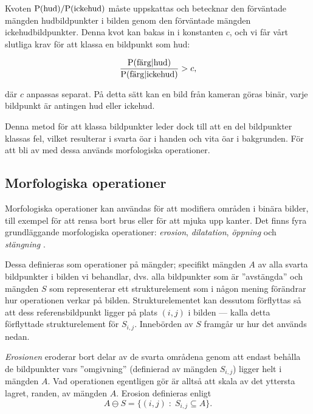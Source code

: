 \documentclass[../rapport_MVEX01-11-05]{subfiles}
\begin{document}
Kvoten $\mathrm{P}(\textrm{hud})/\mathrm{P}(\textrm{ickehud})$ måste uppskattas och betecknar
den förväntade mängden hudbildpunkter i bilden genom den förväntade mängden
ickehudbildpunkter. Denna kvot kan bakas in i konstanten $c$, och vi
får vårt slutliga krav för att klassa en bildpunkt som hud:

\begin{equation*}
	\frac{\mathrm{P}(\textrm{färg}|\textrm{hud})}{\mathrm{P}(\textrm{färg}|\textrm{ickehud})} > c,
\end{equation*}

där $c$ anpassas separat. På detta sätt kan en bild från kameran göras
binär, varje bildpunkt är antingen hud eller ickehud.

Denna metod för att klassa bildpunkter leder dock till att en del
bildpunkter klassas fel, vilket resulterar i svarta öar i handen
och vita öar i bakgrunden. För att bli av med dessa används
morfologiska operationer.

\subsection{Morfologiska operationer}\label{sec:morph}

Morfologiska operationer kan användas för att modifiera områden i
binära bilder, till exempel för att rensa bort brus eller för att
mjuka upp kanter. Det finns fyra grundläggande morfologiska
operationer: \emph{erosion}, \emph{dilatation}, \emph{öppning} och
\emph{stängning} \cite[s.~25]{Rudemo09}.

Dessa definieras som operationer på mängder; specifikt mängden $A$
av alla svarta bildpunkter i bilden vi behandlar, dvs. alla bildpunkter som är
''avstängda'' och mängden $S$ som representerar ett strukturelement
som i någon mening förändrar hur operationen verkar på bilden.
Strukturelementet kan dessutom förflyttas så att dess referensbildpunkt
ligger på plats $(i,j)$ i bilden --- kalla detta förflyttade
strukturelement för $S_{i,j}$. Innebörden av $S$ framgår ur hur det används
nedan.

\emph{Erosionen} eroderar bort delar av de svarta områdena genom
att endast behålla de bildpunkter vars ''omgivning'' (definierad av mängden
$S_{i,j}$) ligger helt i mängden $A$. Vad operationen egentligen gör är alltså
att skala av det yttersta lagret, randen, av mängden $A$. Erosion definieras enligt
\begin{equation*}
  A\ominus S = \{(i,j)\;:\;S_{i,j}\subseteq A\}.
\end{equation*}
\end{document}
